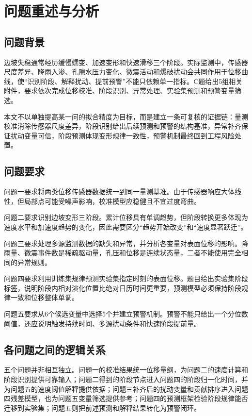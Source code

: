 \chapter{问题重述与分析}

\section{问题背景}

边坡失稳通常经历缓慢蠕变、加速变形和快速滑移三个阶段。实际监测中，传感器尺度差异、降雨入渗、孔隙水压力变化、微震活动和爆破扰动会共同作用于位移曲线，使“识别阶段、解释扰动、提前预警”不能只依赖单一指标。C题给出5组相关附件，要求依次完成位移校准、阶段识别、异常处理、实验集预测和预警变量筛选。

本文不以单独提高某一问的拟合精度为目标，而是建立一条可复核的证据链：量测校准消除传感器尺度差异，阶段识别给出后续预测和预警的结构基准，异常补齐保证扰动变量可信，阶段预测体现变形规律一致性，预警机制最终回到工程风险处置。

\section{问题要求}

问题一要求将两类位移传感器数据统一到同一量测基准。由于传感器响应大体线性，但局部点可能受噪声影响，校准模型应稳健且不宜过度弯曲。

问题二要求识别边坡变形三阶段。累计位移具有单调趋势，但阶段转换更多体现为速度水平和加速度趋势的变化，因此需要区分“趋势开始改变”和“速度显著跃迁”。

问题三要求处理多源监测数据的缺失和异常，并分析各变量对表面位移的影响。降雨量、微震事件数是稀疏驱动量，孔压和位移是连续状态量，二者不能使用完全相同的异常规则。

问题四要求利用训练集规律预测实验集指定时刻的表面位移。题目给出实验集阶段标签，说明阶段内相对演化位置比绝对日历时间更重要，预测模型必须保持阶段规律一致和位移整体单调。

问题五要求从6个候选变量中选择5个并建立预警机制。预警不能只给出一个分位数阈值，还应说明触发持续时间、多源扰动条件和快速阶段提前量。

\section{各问题之间的逻辑关系}

五个问题并非相互独立。问题一的校准结果统一位移量纲，为问题二的速度计算和阶段识别提供可靠输入；问题二得到的阶段节点进入问题四的阶段归一化时间，并为问题五的速度阈值解释提供依据；问题三补齐后的扰动变量和贡献排序进入问题四残差模型，也为问题五变量筛选提供参考；问题四的预测框架检验阶段规律能否迁移到实验集；问题五则把前述预测和解释结果转化为预警闭环。


